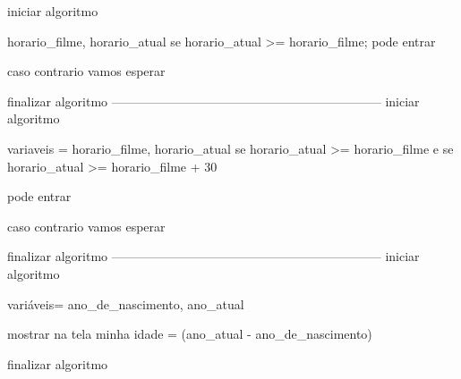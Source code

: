 iniciar algoritmo

    horario_filme, horario_atual
     se horario_atual >= horario_filme;
        pode entrar

    caso contrario
        vamos esperar

finalizar algoritmo
-----------------------------------------------------------------
iniciar algoritmo

    variaveis = horario_filme, horario_atual
    se horario_atual >= horario_filme e se horario_atual >= horario_filme + 30

        pode entrar

    caso contrario
        vamos esperar

finalizar algoritmo
-----------------------------------------------------------------
iniciar algoritmo

    variáveis= ano_de_nascimento, ano_atual
    
    mostrar na tela minha idade = (ano_atual - ano_de_nascimento)

finalizar algoritmo